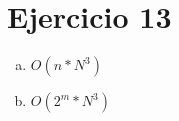 \documentclass{article}
\begin{document}
\section*{Ejercicio 13}




\begin{enumerate}[a)]
    \item $O(n*N^{3})$
    \item $O(2^m*N^{3})$
\end{enumerate}
\end{document}
